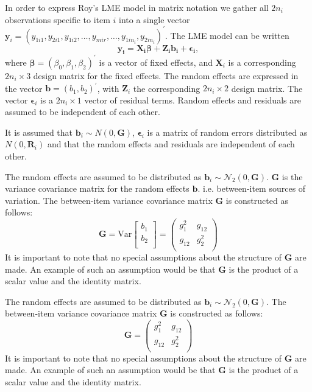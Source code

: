 \documentclass[12pt, a4paper]{report}
\theoremstyle{plain}
\theoremstyle{definition}
\theoremstyle{remark}
\begin{document}
		In order to express Roy's LME model in matrix notation we gather all $2n_i$ observations specific to item $i$ into a single vector  $\boldsymbol{y}_{i} = (y_{1i1},y_{2i1},y_{1i2},\ldots,y_{mir},\ldots,y_{1in_{i}},y_{2in_{i}})^\prime.$ The LME model can be written
		\[
		\boldsymbol{y_{i}} = \boldsymbol{X_{i}\beta} + \boldsymbol{Z_{i}b_{i}} + \boldsymbol{\epsilon_{i}},
		\]
		where $\boldsymbol{\beta}=(\beta_0,\beta_1,\beta_2)^\prime$ is a vector of fixed effects, and $\boldsymbol{X}_i$ is a corresponding $2n_i\times 3$ design matrix for the fixed effects. The random effects are expressed in the vector $\boldsymbol{b}=(b_1,b_2)^\prime$, with $\boldsymbol{Z}_i$ the corresponding $2n_i\times 2$ design matrix. The vector $\boldsymbol{\epsilon}_i$ is a $2n_i\times 1$ vector of residual terms. Random effects and residuals are assumed to be independent of each other.
		
		It is assumed that $\boldsymbol{b}_i \sim N(0,\boldsymbol{G})$, $\boldsymbol{\epsilon}_i$ is a matrix of random errors distributed as $N(0,\boldsymbol{R}_i)$ and that the random effects and residuals are 
		independent of each other.
		
		The random effects are assumed to be distributed as $\boldsymbol{b}_i \sim \mathcal{N}_2(0,\boldsymbol{G})$. 	$\boldsymbol{G}$ is the variance covariance matrix for the random effects $\boldsymbol{b}$.
		i.e. between-item sources of variation. The between-item variance covariance matrix $\boldsymbol{G}$ is constructed as follows:
		\[ \boldsymbol{G} = \mbox{Var}  \left[
		\begin{array}{c}
		b_1   \\
		b_2  \\
		\end{array}
		\right] =  \left(
		\begin{array}{cc}
		g^2_1  & g_{12} \\
		g_{12} & g^2_2 \\
		\end{array}
		\right) \]
		It is important to note that no special assumptions about the structure of $\boldsymbol{G}$ are made. An example of such an assumption would be that $\boldsymbol{G}$ is the product of a scalar value and the identity matrix.
		
		\bigskip
		
		The random effects are assumed to be distributed as $\boldsymbol{b}_i \sim \mathcal{N}_2(0,\boldsymbol{G})$. The between-item variance covariance matrix $\boldsymbol{G}$ is constructed as follows:
		\[ \boldsymbol{G} =\left(
		\begin{array}{cc}
		g^2_1  & g_{12} \\
		g_{12} & g^2_2 \\
		\end{array}
		\right) \]
		It is important to note that no special assumptions about the structure of $\boldsymbol{G}$ are made. An example of such an assumption would be that $\boldsymbol{G}$ is the product of a scalar value and the identity matrix.
		
\end{document}
